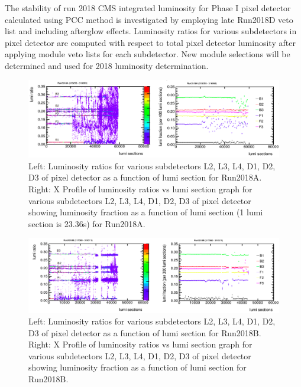 The stability of run 2018 CMS integrated luminosity for Phase I pixel detector calculated using PCC method is investigated by employing late Run2018D veto list and including afterglow effects. Luminosity ratios for various subdetectors in pixel detector are computed with respect to total pixel detector luminosity after applying module veto lists for each subdetector. New module selections will be determined and used for 2018 luminosity determination. 
\begin{figure}[H]
  \centering
  \includegraphics[width=1\columnwidth]{./t25ld-kgsjf.png}
  \caption{Left: Luminosity ratios for various subdetectors L2, L3, L4, D1, D2, D3 of pixel detector as a function of lumi section for Run2018A. Right: X Profile of luminosity ratios vs lumi section graph for various subdetectors L2, L3, L4, D1, D2, D3 of pixel detector showing luminosity fraction as a function of lumi section (1 lumi section is 23.36s) for Run2018A.}
  \label{fig:CMS}
\end{figure}


\begin{figure}[H]
  \centering
  \includegraphics[width=1\columnwidth]{./tjag3-rger6.png}
  \caption{Left: Luminosity ratios for various subdetectors L2, L3, L4, D1, D2, D3 of pixel detector as a function of lumi section for Run2018B. Right: X Profile of luminosity ratios vs lumi section graph for various subdetectors L2, L3, L4, D1, D2, D3 of pixel detector showing luminosity fraction as a function of lumi section for Run2018B. }
  \label{fig:CMS}
\end{figure}



